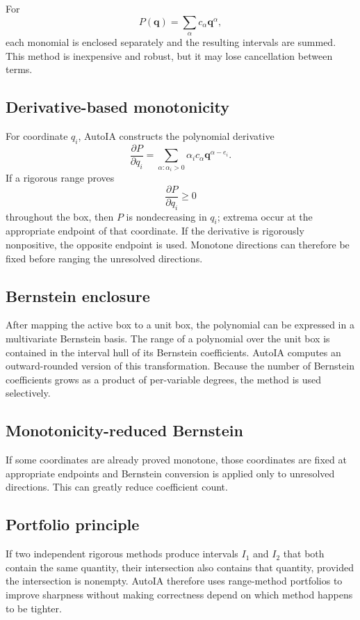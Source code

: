 \documentclass[11pt]{article}
\newcommand{\qv}{\mathbf{q}}
\begin{document}
For
\[
  P(\qv)=\sum_\alpha c_\alpha\qv^\alpha,
\]
each monomial is enclosed separately and the resulting intervals are summed.
This method is inexpensive and robust, but it may lose cancellation between
terms.

\subsection{Derivative-based monotonicity}

For coordinate \(q_i\), AutoIA constructs the polynomial derivative
\[
  \frac{\partial P}{\partial q_i}
  =\sum_{\alpha:\alpha_i>0}
  \alpha_i c_\alpha\qv^{\alpha-e_i}.
\]
If a rigorous range proves
\[
  \frac{\partial P}{\partial q_i}\ge0
\]
throughout the box, then \(P\) is nondecreasing in \(q_i\); extrema occur at the
appropriate endpoint of that coordinate.  If the derivative is rigorously
nonpositive, the opposite endpoint is used.  Monotone directions can therefore
be fixed before ranging the unresolved directions.

\subsection{Bernstein enclosure}

After mapping the active box to a unit box, the polynomial can be expressed in a
multivariate Bernstein basis.  The range of a polynomial over the unit box is
contained in the interval hull of its Bernstein coefficients.  AutoIA computes
an outward-rounded version of this transformation.  Because the number of
Bernstein coefficients grows as a product of per-variable degrees, the method is
used selectively.

\subsection{Monotonicity-reduced Bernstein}

If some coordinates are already proved monotone, those coordinates are fixed at
appropriate endpoints and Bernstein conversion is applied only to unresolved
directions.  This can greatly reduce coefficient count.

\subsection{Portfolio principle}

If two independent rigorous methods produce intervals \(I_1\) and \(I_2\) that
both contain the same quantity, their intersection also contains that quantity,
provided the intersection is nonempty.  AutoIA therefore uses range-method
portfolios to improve sharpness without making correctness depend on which
method happens to be tighter.
\end{document}
